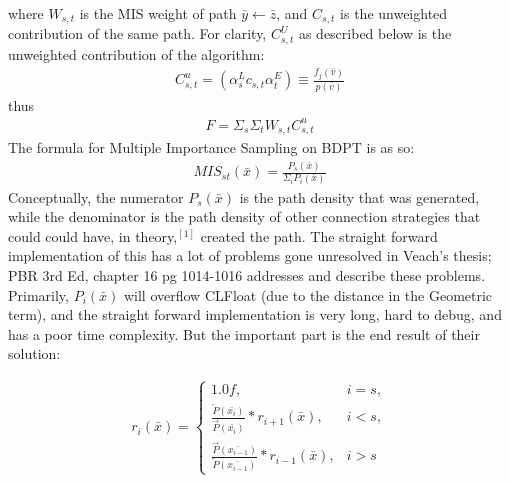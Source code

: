 \documentclass{article}
\begin{document}
    where $W_{s, t}$ is the MIS weight of path $\bar{y} \leftarrow \bar{z}$, and
    $C_{s, t}$ is the unweighted contribution of the same path. For clarity,
    $C^U_{s, t}$ as described below is the unweighted contribution of the
    algorithm:
  \begin{align}
    C^u_{s, t} = (\alpha^L_s c_{s, t} \alpha^E_t) \equiv
    \frac{f_j(\bar{v})}{p(\bar{v})}
  \end{align}
  thus
  \begin{align}
    F = \Sigma_s\Sigma_tW_{s, t}C^u_{s, t}
  \end{align}
    The formula for Multiple Importance Sampling on BDPT is as so:
  \begin{align}
    MIS_{st}(\bar{x}) = \frac{P_s(\bar{x})}{\Sigma_i{P_i(\bar{x})}} 
  \end{align}
    Conceptually, the numerator $P_s(\bar{x})$ is the path density that was
    generated, while the denominator is the path density of other connection
    strategies that could could have, in theory,$^{[1]}$ created the path. The
    straight forward implementation of this has a lot of problems gone
    unresolved in Veach's thesis; PBR 3rd Ed, chapter 16 pg 1014-1016 addresses
    and describe these problems. Primarily, $P_i(\bar{x})$ will overflow
    CLFloat (due to the distance in the Geometric term), and the straight
    forward implementation is very long, hard to debug, and has a poor time
    complexity. But the important part is the end result of their solution:

  \begin{align}
    r_i (\bar{x}) = 
    \begin{cases}
      1.0f, & i = s,\\
      \frac{\overleftarrow{P}(\bar{x_i})}{\overrightarrow{P}(\bar{x_i})} *
      r_{i+1}(\bar{x}), & i < s,\\
      \frac{\overrightarrow{P}(\bar{x_{i-1}})}{\overleftarrow{P}(\bar{x_{i-1}})}
      * r_{i-1}(\bar{x}), & i > s
    \end{cases}
  \end{align}
\end{document}
